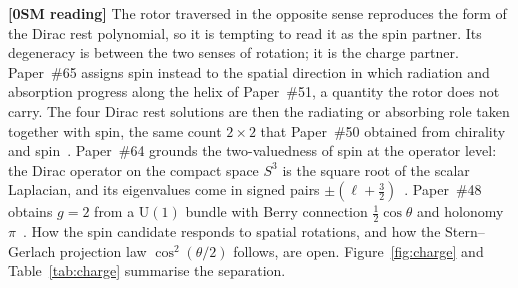 \documentclass[%
 reprint, amsmath,amssymb, aps, prb, ]{revtex4-2}
\numberwithin{equation}{section}
\begin{document}
\textbf{[0SM reading]} The rotor traversed in the opposite sense reproduces the form of the Dirac rest polynomial, so it is tempting to read it as the spin partner. Its degeneracy is between the two senses of rotation; it is the charge partner. Paper~\#65 assigns spin instead to the spatial direction in which radiation and absorption progress along the helix of Paper~\#51, a quantity the rotor does not carry. The four Dirac rest solutions are then the radiating or absorbing role taken together with spin, the same count $2\times2$ that Paper~\#50 obtained from chirality and spin~\cite{hanamura50}. Paper~\#64 grounds the two-valuedness of spin at the operator level: the Dirac operator on the compact space $S^{3}$ is the square root of the scalar Laplacian, and its eigenvalues come in signed pairs $\pm(\ell+\tfrac32)$~\cite{hanamura64}. Paper~\#48 obtains $g=2$ from a $\mathrm{U}(1)$ bundle with Berry connection $\tfrac12\cos\theta$ and holonomy $\pi$~\cite{hanamura48}. How the spin candidate responds to spatial rotations, and how the Stern--Gerlach projection law $\cos^{2}(\theta/2)$ follows, are open. Figure~\ref{fig:charge} and Table~\ref{tab:charge} summarise the separation.
\end{document}
